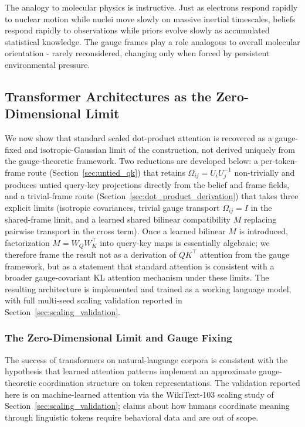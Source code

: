 \documentclass[11pt]{article}
\begin{document}
The analogy to molecular physics is instructive. Just as electrons respond rapidly to nuclear motion while nuclei move slowly on massive inertial timescales, beliefs respond rapidly to observations while priors evolve slowly as accumulated statistical knowledge. The gauge frames play a role analogous to overall molecular orientation - rarely reconsidered, changing only when forced by persistent environmental pressure.

\subsection{Transformer Architectures as the Zero-Dimensional Limit}
\label{sec:transformers}

We now show that standard scaled dot-product attention is recovered as a gauge-fixed and isotropic-Gaussian limit of the construction, not derived uniquely from the gauge-theoretic framework. Two reductions are developed below: a per-token-frame route (Section~\ref{sec:untied_qk}) that retains $\Omega_{ij} = U_iU_j^{-1}$ non-trivially and produces untied query-key projections directly from the belief and frame fields, and a trivial-frame route (Section~\ref{sec:dot_product_derivation}) that takes three explicit limits (isotropic covariances, trivial gauge transport $\Omega_{ij} = I$ in the shared-frame limit, and a learned shared bilinear compatibility $M$ replacing pairwise transport in the cross term). Once a learned bilinear $M$ is introduced, factorization $M = W_QW_K^\top$ into query-key maps is essentially algebraic; we therefore frame the result not as a derivation of $QK^\top$ attention from the gauge framework, but as a statement that standard attention is consistent with a broader gauge-covariant KL attention mechanism under these limits. The resulting architecture is implemented and trained as a working language model, with full multi-seed scaling validation reported in Section~\ref{sec:scaling_validation}.

\subsubsection{The Zero-Dimensional Limit and Gauge Fixing}

The success of transformers on natural-language corpora is consistent with the hypothesis that learned attention patterns implement an approximate gauge-theoretic coordination structure on token representations. The validation reported here is on machine-learned attention via the WikiText-103 scaling study of Section~\ref{sec:scaling_validation}; claims about how humans coordinate meaning through linguistic tokens require behavioral data and are out of scope.
\end{document}

